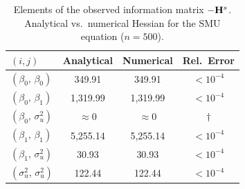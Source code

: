 \begin{table}[htbp]
\centering
\caption[Analytical vs.\ numerical Hessian for the SMU equation]{Elements of the observed information matrix $-\mathbf{H}^s$. Analytical vs.\ numerical Hessian for the SMU equation ($n = 500$).}
\label{tab:hessian_check_smu}
\begin{tabular}{lccc}
\toprule
$(i,j)$ & Analytical & Numerical & Rel.\ Error \\
\midrule
$(\beta_0,\, \beta_0)$ & 349.91 & 349.91 & $< 10^{-4}$ \\
$(\beta_0,\, \beta_1)$ & 1{,}319.99 & 1{,}319.99 & $< 10^{-4}$ \\
$(\beta_0,\, \sigma_u^2)$ & $\approx 0$ & $\approx 0$ & $\dagger$ \\
$(\beta_1,\, \beta_1)$ & 5{,}255.14 & 5{,}255.14 & $< 10^{-4}$ \\
$(\beta_1,\, \sigma_u^2)$ & 30.93 & 30.93 & $< 10^{-4}$ \\
$(\sigma_u^2,\, \sigma_u^2)$ & 122.44 & 122.44 & $< 10^{-4}$ \\
\bottomrule
\end{tabular}
\end{table}
